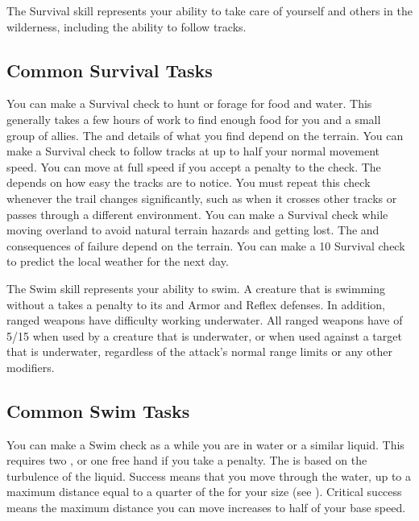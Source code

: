 \newpage
{}
        The Survival skill represents your ability to take care of yourself and others in the wilderness, including the ability to follow tracks.

    \subsection{Common Survival Tasks}
         You can make a Survival check to hunt or forage for food and water.
        This generally takes a few hours of work to find enough food for you and a small group of allies.
        The  and details of what you find depend on the terrain.
         You can make a Survival check to follow tracks at up to half your normal movement speed.
        You can move at full speed if you accept a  penalty to the check.
        The  depends on how easy the tracks are to notice.
        You must repeat this check whenever the trail changes significantly, such as when it crosses other tracks or passes through a different environment.
         You can make a Survival check while moving overland to avoid natural terrain hazards and getting lost.
        The  and consequences of failure depend on the terrain.
         You can make a  10 Survival check to predict the local weather for the next day.

\newpage
{}
        The Swim skill represents your ability to swim.
        A creature that is swimming without a  takes a  penalty to its  and Armor and Reflex defenses.
        In addition, ranged weapons have difficulty working underwater.
        All ranged weapons have  of 5/15 when used by a creature that is underwater, or when used against a target that is underwater, regardless of the attack's normal range limits or any other modifiers.

    \subsection{Common Swim Tasks}
         You can make a Swim check as a  while you are in water or a similar liquid.
        This requires two , or one free hand if you take a  penalty.
        The  is based on the turbulence of the liquid.
        Success means that you move through the water, up to a maximum distance equal to a quarter of the  for your size (see ).
        Critical success means the maximum distance you can move increases to half of your base speed.

